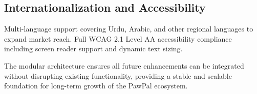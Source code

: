 \subsection{Internationalization and Accessibility}
Multi-language support covering Urdu, Arabic, and other regional languages to expand market reach. Full WCAG 2.1 Level AA accessibility compliance including screen reader support and dynamic text sizing.

The modular architecture ensures all future enhancements can be integrated without disrupting existing functionality, providing a stable and scalable foundation for long-term growth of the PawPal ecosystem.
